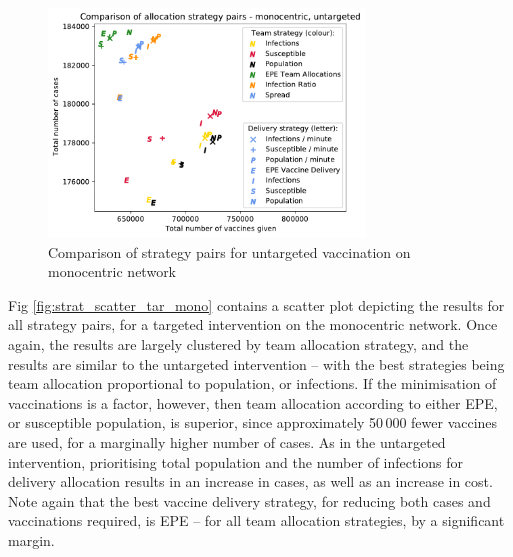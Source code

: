 \documentclass[10pt,letterpaper]{article}
\begin{document}
\begin{figure}[ht!]{\textwidth}
\begin{center}
    \includegraphics[width=0.75\textwidth]{figures/strategies/team_vaccine_scatter_untargeted_monocentric.pdf}
    \caption{Comparison of strategy pairs for untargeted vaccination on monocentric network}
    \label{fig:strat_scatter_unt_mono}
\end{center}
\end{figure}

Fig \ref{fig:strat_scatter_tar_mono} contains a scatter plot depicting the results for all strategy pairs, for a targeted intervention on the monocentric network. Once again, the results are largely clustered by team allocation strategy, and the results are similar to the untargeted intervention -- with the best strategies being team allocation proportional to population, or infections. If the minimisation of vaccinations is a factor, however, then team allocation according to either EPE, or susceptible population, is superior, since approximately 50\,000 fewer vaccines are used, for a marginally higher number of cases. As in the untargeted intervention, prioritising total population and the number of infections for delivery allocation results in an increase in cases, as well as an increase in cost. Note again that the best vaccine delivery strategy, for reducing both cases and vaccinations required, is EPE -- for all team allocation strategies, by a significant margin. 
\end{document}

